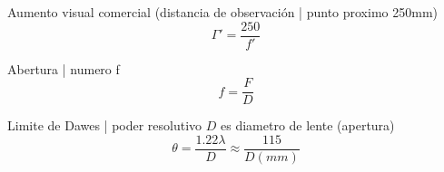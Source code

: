 \documentclass[12pt, letterpaper, twoside]{article}
\begin{document}
	Aumento visual comercial (distancia de observación | punto proximo 250mm)
	\begin{equation}
		\Gamma' = \frac{250}{f'}
	\end{equation}

	Abertura | numero f
	\begin{equation}
		f = \frac{F}{D}
	\end{equation}

	Limite de Dawes | poder resolutivo $D$ es diametro de lente (apertura)
	\begin{equation}
		\theta = \frac{1.22 \lambda}{D} \approx \frac{115}{D (mm)}
	\end{equation}
	
	
\end{document}
